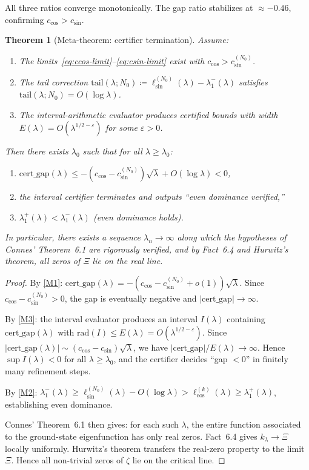 \documentclass[12pt,a4paper]{article}
\newtheorem{theorem}{Theorem}[section]
\theoremstyle{definition}
\theoremstyle{remark}
\begin{document}
\noindent All three ratios converge monotonically. The gap ratio stabilizes at $\approx -0.46$, confirming $c_{\cos} > c_{\sin}$.

\begin{theorem}[Meta-theorem: certifier termination]
\label{thm:meta}
Assume:
\begin{enumerate}[label=\textup{(M\arabic*)}]
  \item\label{M1} The limits~\eqref{eq:ccos-limit}--\eqref{eq:csin-limit} exist with $c_{\cos} > c_{\sin}^{(N_0)}$.
  \item\label{M2} The tail correction $\mathrm{tail}(\lambda; N_0) \coloneqq \ell_{\sin}^{(N_0)}(\lambda) - \lambda_1^-(\lambda)$ satisfies $\mathrm{tail}(\lambda; N_0) = O(\log\lambda)$.
  \item\label{M3} The interval-arithmetic evaluator produces certified bounds with width $E(\lambda) = O(\lambda^{1/2-\varepsilon})$ for some $\varepsilon > 0$.
\end{enumerate}
Then there exists $\lambda_0$ such that for all $\lambda \geq \lambda_0$:
\begin{enumerate}[label=\textup{(\roman*)}]
  \item $\mathrm{cert\_gap}(\lambda) \leq -(c_{\cos} - c_{\sin}^{(N_0)})\sqrt{\lambda} + O(\log\lambda) < 0$,
  \item the interval certifier terminates and outputs ``even dominance verified,''
  \item $\lambda_1^+(\lambda) < \lambda_1^-(\lambda)$ (even dominance holds).
\end{enumerate}
In particular, there exists a sequence $\lambda_n \to \infty$ along which the hypotheses of Connes' Theorem~6.1 are rigorously verified, and by Fact~6.4 and Hurwitz's theorem, all zeros of $\Xi$ lie on the real line.
\end{theorem}

\begin{proof}
By \ref{M1}: $\mathrm{cert\_gap}(\lambda) = -(c_{\cos} - c_{\sin}^{(N_0)} + o(1))\sqrt{\lambda}$. Since $c_{\cos} - c_{\sin}^{(N_0)} > 0$, the gap is eventually negative and $|\mathrm{cert\_gap}| \to \infty$.

By \ref{M3}: the interval evaluator produces an interval $I(\lambda)$ containing $\mathrm{cert\_gap}(\lambda)$ with $\mathrm{rad}(I) \leq E(\lambda) = O(\lambda^{1/2-\varepsilon})$. Since $|\mathrm{cert\_gap}(\lambda)| \sim (c_{\cos}-c_{\sin})\sqrt{\lambda}$, we have $|\mathrm{cert\_gap}| / E(\lambda) \to \infty$. Hence $\sup I(\lambda) < 0$ for all $\lambda \geq \lambda_0$, and the certifier decides ``gap $< 0$'' in finitely many refinement steps.

By \ref{M2}: $\lambda_1^-(\lambda) \geq \ell_{\sin}^{(N_0)}(\lambda) - O(\log\lambda) > \ell_{\cos}^{(k)}(\lambda) \geq \lambda_1^+(\lambda)$, establishing even dominance.

Connes' Theorem~6.1 then gives: for each such $\lambda$, the entire function associated to the ground-state eigenfunction has only real zeros. Fact~6.4 gives $k_\lambda \to \Xi$ locally uniformly. Hurwitz's theorem transfers the real-zero property to the limit $\Xi$. Hence all non-trivial zeros of $\zeta$ lie on the critical line.
\end{proof}
\end{document}
